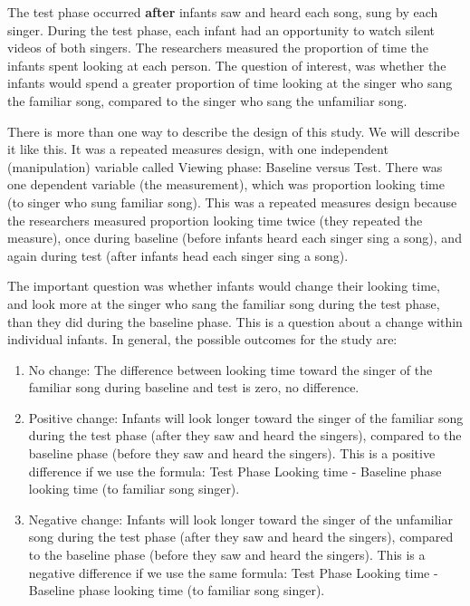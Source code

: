 \documentclass[
]{book}
\begin{document}
The test phase occurred \textbf{after} infants saw and heard each song, sung by each singer. During the test phase, each infant had an opportunity to watch silent videos of both singers. The researchers measured the proportion of time the infants spent looking at each person. The question of interest, was whether the infants would spend a greater proportion of time looking at the singer who sang the familiar song, compared to the singer who sang the unfamiliar song.

There is more than one way to describe the design of this study. We will describe it like this. It was a repeated measures design, with one independent (manipulation) variable called Viewing phase: Baseline versus Test. There was one dependent variable (the measurement), which was proportion looking time (to singer who sung familiar song). This was a repeated measures design because the researchers measured proportion looking time twice (they repeated the measure), once during baseline (before infants heard each singer sing a song), and again during test (after infants head each singer sing a song).

The important question was whether infants would change their looking time, and look more at the singer who sang the familiar song during the test phase, than they did during the baseline phase. This is a question about a change within individual infants. In general, the possible outcomes for the study are:

\begin{enumerate}
\def\labelenumi{\arabic{enumi}.}
\item
  No change: The difference between looking time toward the singer of the familiar song during baseline and test is zero, no difference.
\item
  Positive change: Infants will look longer toward the singer of the familiar song during the test phase (after they saw and heard the singers), compared to the baseline phase (before they saw and heard the singers). This is a positive difference if we use the formula: Test Phase Looking time - Baseline phase looking time (to familiar song singer).
\item
  Negative change: Infants will look longer toward the singer of the unfamiliar song during the test phase (after they saw and heard the singers), compared to the baseline phase (before they saw and heard the singers). This is a negative difference if we use the same formula: Test Phase Looking time - Baseline phase looking time (to familiar song singer).
\end{enumerate}
\end{document}
